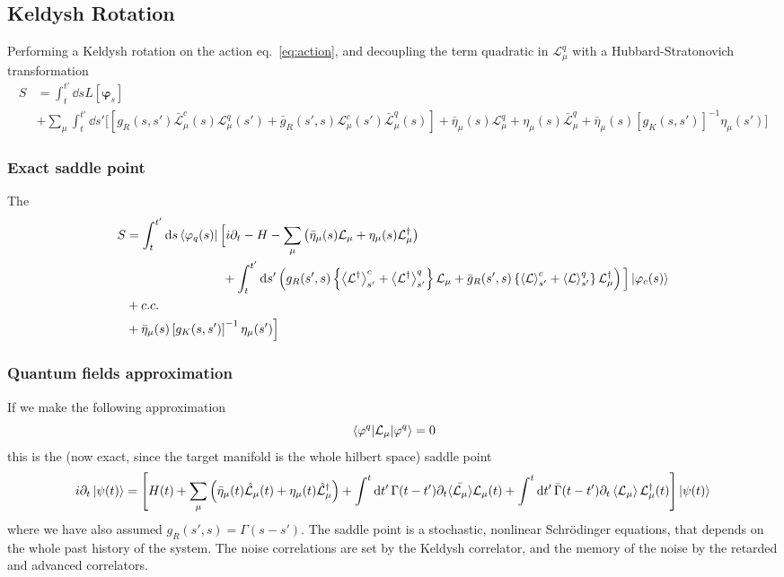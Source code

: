 \documentclass{article}
\let\vec\bm
\begin{document}
\subsection{Keldysh Rotation}
Performing a Keldysh rotation on the action eq.~\ref{eq:action}, and decoupling the term quadratic in $\mathcal{L}_\mu^q$ with a Hubbard-Stratonovich transformation
\begin{align}
    S &= \int_t^{t'} \dd{s}L[\vec{\varphi}_s]\\
    &+  \sum_\mu \int_t^{t'}\dd{s'}\Big[\left[g_R(s, s') \bar{\mathcal{L}}_\mu^c(s)\mathcal{L}^q_\mu(s')+\bar{g}_R(s', s) \mathcal{L}_\mu^c(s')\bar{\mathcal{L}}^q_\mu(s)\right] + \bar{\eta}_\mu(s) \mathcal{L}_\mu^q + \eta_\mu(s) \bar{\mathcal{L}}_\mu^q + \bar{\eta}_\mu(s) \left[g_K(s, s')\right]^{-1}\eta_\mu(s') \Big]\nonumber
\end{align}
\subsubsection{Exact saddle point}
The 
\begin{align}
    S &= \int_t^{t'} \dd{s} \bra{\varphi_q(s)} \Big[i\partial_t - H-\sum_\mu\left(\bar{\eta}_\mu(s)\mathcal{L}_\mu + \eta_\mu(s)\mathcal{L}^\dagger_\mu\right)\nonumber \\
    &\qquad\qquad\qquad\quad~~ + \int_t^{t'} \dd{s'} \left(g_R(s', s)\left\{\ev{\mathcal{L}^\dagger}^c_{s'} +\ev{\mathcal{L}^\dagger}^q_{s'}\right\}\mathcal{L}_\mu + \bar{g}_R(s', s) \left\{\ev{\mathcal{L}}^c_{s'}+\ev{\mathcal{L}}^q_{s'}\right\}\mathcal{L}_\mu^\dagger\right)\Big]\ket{\varphi_c(s)} \\
    &+ c.c.\\
    &+ \bar{\eta}_\mu(s) \left[g_K(s, s')\right]^{-1}\eta_\mu(s') \Big]\nonumber
\end{align}
\subsubsection{Quantum fields approximation}
If we make the following approximation
\begin{equation}
    \mel{\varphi^q}{\mathcal{L}_\mu}{\varphi^q} = 0
\end{equation}
this is the (now exact, since the target manifold is the whole hilbert space) saddle point
\begin{equation}
    i\partial_t \ket{\psi(t)} =\left[H(t) + \sum_\mu \left(\bar{\eta}_\mu(t) \hat{\mathcal{L}}_\mu(t) + \eta_\mu(t)\hat{\mathcal{L}}^\dagger_\mu \right) + \int^t\dd{t'} \Gamma(t-t') \partial_t \bar{\ev{\mathcal{L}_\mu}} \mathcal{L}_\mu(t) + \int^t\dd{t'} \bar{\Gamma}(t-t') \partial_t \ev{\mathcal{L}_\mu}\mathcal{L}^\dagger_\mu(t)\right]\ket{\psi(t)}\nonumber
\end{equation}
where we have also assumed $g_R(s', s) = \Gamma(s-s')$. 
The saddle point is a stochastic, nonlinear Schr\"odinger equations, that depends on the whole past history of the system. 
The noise correlations are set by the Keldysh correlator, and the memory of the noise by the retarded and advanced correlators. 
\end{document}
